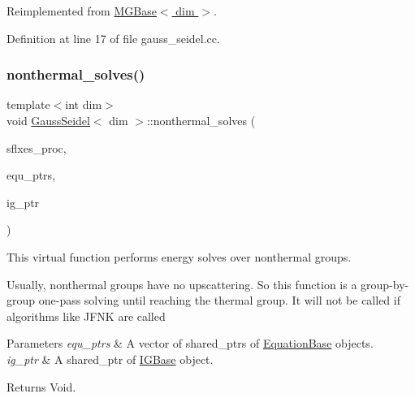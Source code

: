 Reimplemented from \hyperlink{class_m_g_base_a3586c47d901608bc42792c6de456b1cb}{M\+G\+Base$<$ dim $>$}.



Definition at line 17 of file gauss\+\_\+seidel.\+cc.

\mbox{\label{class_gauss_seidel_a28fc4ef9150773f587f90951c704c994}} 
\subsubsection{\texorpdfstring{nonthermal\+\_\+solves()}{nonthermal\_solves()}}
{\footnotesize\ttfamily template$<$int dim$>$ \\
void \hyperlink{class_gauss_seidel}{Gauss\+Seidel}$<$ dim $>$\+::nonthermal\+\_\+solves (\begin{DoxyParamCaption}\item[{std\+::vector$<$ Vector$<$ double $>$ $>$ \&}]{sflxes\+\_\+proc,  }\item[{std\+::vector$<$ std\+\_\+cxx11\+::shared\+\_\+ptr$<$ \hyperlink{class_equation_base}{Equation\+Base}$<$ dim $>$ $>$ $>$ \&}]{equ\+\_\+ptrs,  }\item[{std\+\_\+cxx11\+::shared\+\_\+ptr$<$ \hyperlink{class_i_g_base}{I\+G\+Base}$<$ dim $>$ $>$}]{ig\+\_\+ptr }\end{DoxyParamCaption})\hspace{0.3cm}{\ttfamily [virtual]}}

This virtual function performs energy solves over nonthermal groups.

Usually, nonthermal groups have no upscattering. So this function is a group-\/by-\/ group one-\/pass solving until reaching the thermal group. It will not be called if algorithms like J\+F\+NK are called


\begin{DoxyParams}{Parameters}
{\em equ\+\_\+ptrs} & A vector of shared\+\_\+ptr\textquotesingle{}s of \hyperlink{class_equation_base}{Equation\+Base} objects. \\
\hline
{\em ig\+\_\+ptr} & A shared\+\_\+ptr of \hyperlink{class_i_g_base}{I\+G\+Base} object. \\
\hline
\end{DoxyParams}
\begin{DoxyReturn}{Returns}
Void. 
\end{DoxyReturn}


